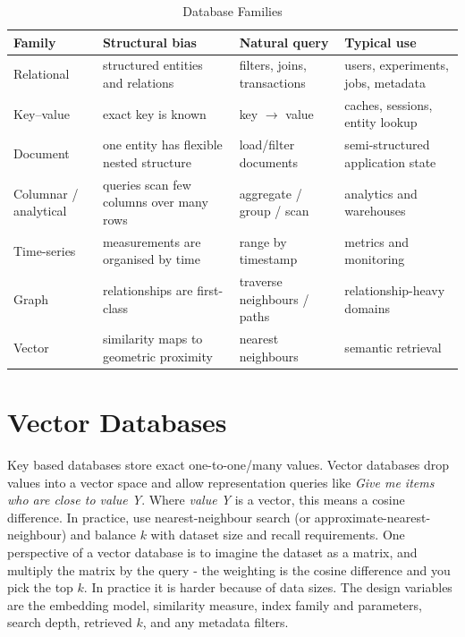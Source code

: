 \begin{table}[htbp]
    \centering
    \caption{Database Families}
    \label{tab:database-families}
    \begin{tabularx}{\linewidth}{@{}lXXX@{}}
    \toprule
    \textbf{Family} & \textbf{Structural bias} & \textbf{Natural query} & \textbf{Typical use} \\
    \midrule
    Relational & structured entities and relations & filters, joins, transactions & users, experiments, jobs, metadata \\
    Key--value & exact key is known & key \(\rightarrow\) value & caches, sessions, entity lookup \\
    Document & one entity has flexible nested structure & load/filter documents & semi-structured application state \\
    Columnar / analytical & queries scan few columns over many rows & aggregate / group / scan & analytics and warehouses \\
    Time-series & measurements are organised by time & range by timestamp & metrics and monitoring \\
    Graph & relationships are first-class & traverse neighbours / paths & relationship-heavy domains \\
    Vector & similarity maps to geometric proximity & nearest neighbours & semantic retrieval \\
    \bottomrule
    \end{tabularx}
\end{table}


\section{Vector Databases}
\label{sec:vector-databases}
Key based databases store exact one-to-one/many values. 
Vector databases drop values into a vector space and allow representation queries like \textit{Give me items who are close to value Y}. 
Where \textit{value Y} is a vector, this means a cosine difference. 
In practice, use nearest-neighbour search (or approximate-nearest-neighbour) and balance $k$ with dataset size and recall requirements.
One perspective of a vector database is to imagine the dataset as a matrix, and multiply the matrix by the query - the weighting is the cosine difference and you pick the top $k$. 
In practice it is harder because of data sizes.
The design variables are the embedding model, similarity measure, index family and parameters, search depth, retrieved \(k\), and any metadata filters.

